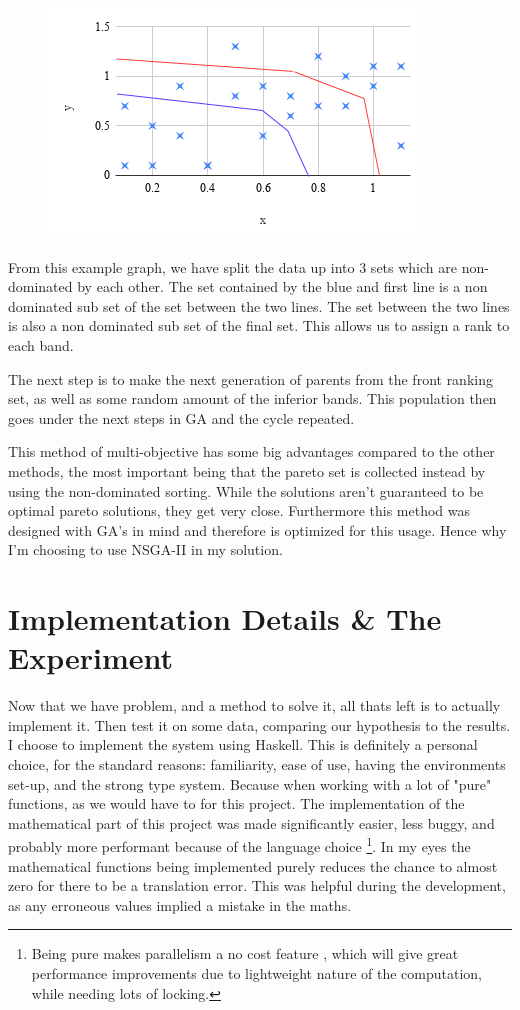 \documentclass[11pt]{article}
\begin{document}
    \begin{figure}[H]
        \includegraphics{NSGArank}
    \end{figure}
    From this example graph, we have split the data up into 3 sets which are non-dominated
    by each other. The set contained by the blue and first line is a non dominated sub set
    of the set between the two lines. The set between the two lines is also a non dominated
    sub set of the final set. This allows us to assign a rank to each band.

    The next step is to make the next generation of parents from the front ranking
    set, as well as some random amount of the inferior bands. This population
    then goes under the next steps in GA and the cycle repeated.

    This method of multi-objective has some big advantages compared to the other methods,
    the most important being that the pareto set is collected instead by using the non-dominated
    sorting. While the solutions aren't guaranteed to be optimal pareto solutions, they
    get very close. Furthermore this method was designed with GA's in mind and therefore is
    optimized for this usage. Hence why I'm choosing to use NSGA-II in my solution.


\section{Implementation Details \& The Experiment}

    Now that we have problem, and a method to solve it, all thats left is to actually
    implement it. Then test it on some data, comparing our hypothesis to the results.
    I choose to implement the system using Haskell. This is definitely a personal
    choice, for the standard reasons: familiarity, ease of use, having the environments
    set-up, and the strong type system. Because when working with a lot of "pure"
    functions, as we would have to for this project. The implementation 
    of the mathematical part of this project was made significantly
    easier, less buggy, and probably more performant because of the language choice
    \footnote{Being pure makes parallelism a no cost feature \cite{HarrisMarlowJones, Chakravarty}, 
    which will give great performance improvements due to lightweight nature of the 
    computation, while needing lots of locking. }.
    In my eyes the mathematical functions
    being implemented purely reduces the chance to almost zero for there to be a translation
    error. This was helpful during the development, as any erroneous values implied a mistake
    in the maths.
\end{document}
